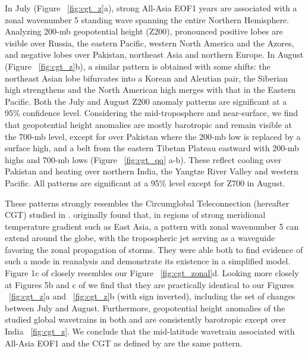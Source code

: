 	In July (Figure ~\ref{fig:cgt_z}a), strong All-Asia EOF1 years are associated with a zonal wavenumber 5 standing wave spanning the entire Northern Hemisphere. Analyzing 200-mb geopotential height (Z200),  pronounced positive lobes are visible over Russia, the eastern Pacific, western North America and the Azores, and negative lobes over Pakistan, northeast Asia and northern Europe. In August (Figure ~\ref{fig:cgt_z}b), a similar pattern is obtained with some shifts: the northeast Asian lobe bifurcates into a Korean and Aleutian pair, the Siberian high strengthens and the North American high merges with that in the Eastern Pacific. Both the July and August Z200 anomaly patterns are significant at a 95\% confidence level. Considering the mid-troposphere and near-surface, we find that geopotential height anomalies are mostly barotropic and remain visible at the 700-mb level, except for over Pakistan where the 200-mb low is replaced by a surface high, and a belt from the eastern Tibetan Plateau eastward with 200-mb highs and 700-mb lows (Figure ~\ref{fig:cgt_qq} a-b). These reflect cooling over Pakistan and heating over northern India, the Yangtze River Valley and western Pacific. All patterns are significant at a 95\% level except for Z700 in August.
	
	These patterns strongly resembles the Circumglobal Teleconnection (hereafter CGT) studied in \citet{Ding2005a}. \citet{Branstator2002} originally found that, in regions of strong meridional temperature gradient such as East Asia, a pattern with zonal wavenumber 5 can extend around the globe, with the tropospheric jet serving as a waveguide favoring the zonal propagation of storms. They were able both to find evidence of such a mode in reanalysis and demonstrate its existence in a simplified model. Figure 1c of \citet{Branstator2002} closely resembles our Figure ~\ref{fig:cgt_zonal}d. Looking more closely at Figures 5b and c of \citet{Ding2005a} we find that they are practically identical to our Figures ~\ref{fig:cgt_z}a and ~\ref{fig:cgt_z}b (with sign inverted), including the set of changes between July and August. Furthermore, geopotential height anomalies of the studied global wavetrains in both \citet{Branstator2002} and \citet{Ding2005a} are consistently barotropic except over India ~\ref{fig:cgt_z}. We conclude that the mid-latitude wavetrain associated with All-Asia EOF1 and the CGT as defined by \citet{Ding2005a} are the same pattern.
	
